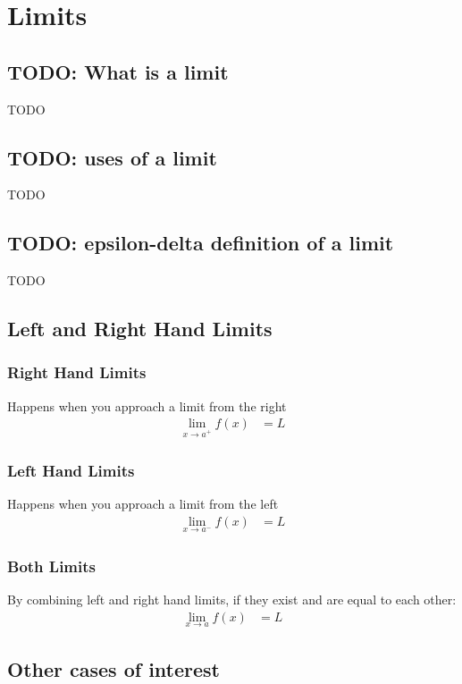 \chapter{Limits}

\section{TODO: What is a limit}
TODO

\section{TODO: uses of a limit}
TODO

\section{TODO: epsilon-delta definition of a limit}
TODO

\section{Left and Right Hand Limits}

\subsection{Right Hand Limits}
Happens when you approach a limit from the right
\begin{align}
  \lim_{x \to a^+} f(x) &= L
\end{align}

\subsection{Left Hand Limits}
Happens when you approach a limit from the left
\begin{align}
  \lim_{x \to a^-} f(x) &= L
\end{align}

\subsection{Both Limits}
By combining left and right hand limits, if they exist and are equal to each other:
\begin{align}
  \lim_{x \to a} f(x) &= L
\end{align}

\section{Other cases of interest}
